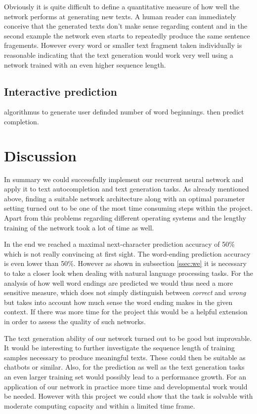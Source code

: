 \documentclass[11pt,a4paper,bibliography=totocnumbered,listof=totocnumbered]{scrartcl}
\begin{document}
Obviously it is quite difficult to define a quantitative measure of how well the network performs at generating new texts. A human reader can immediately conceive that the generated texts don't make sense regarding content and in the second example the network even starts to repeatedly produce the same sentence fragements. However every word or smaller text fragment taken individually is reasonable indicating that the text generation would work very well using a network trained with an even higher sequence length.


\subsection{Interactive prediction}
algorithmus to generate user definded number of word beginnings. then predict completion.

\pagebreak
\section{Discussion}
In summary we could successfully implement our recurrent neural network and apply it to text autocompletion and text generation tasks. As already mentioned above, finding a suitable network architecture along with an optimal parameter setting turned out to be one of the most time consuming steps within the project. Apart from this problems regarding different operating systems and the lengthy training of the network took a lot of time as well. 

In the end we reached a maximal next-character prediction accuracy of 50\% which is not really convincing at first sight. The word-ending prediction accuracy is even lower than 50\%. However as shown in subsection \ref{ssec:we} it is necessary to take a closer look when dealing with natural language processing tasks. For the analysis of how well word endings are predicted we would thus need a more sensitive measure, which does not simply distinguish between \textit{correct} and \textit{wrong} but takes into account how much sense the word ending makes in the given context. If there was more time for the project this would be a helpful extension in order to assess the quality of such networks. 

The text generation ability of our network turned out to be good but improvable. It would be interesting to further investigate the sequence length of training samples necessary to produce meaningful texts. These could then be suitable as chatbots or similar. Also, for the prediction as well as the text generation tasks an even larger training set would possibly lead to a performance growth. For an application of our network in practice more time and developmental work would be needed. However with this project we could show that the task is solvable with moderate computing capacity and within a limited time frame. 
\end{document}
